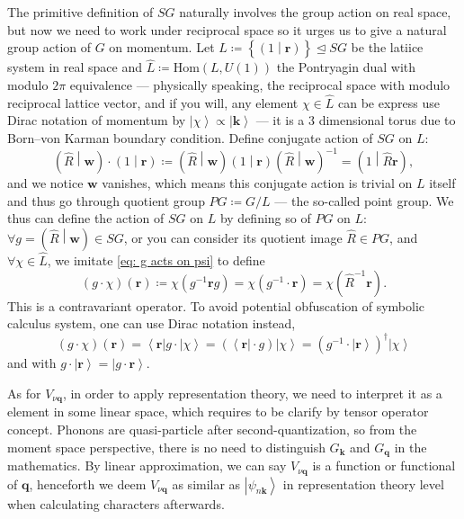 \documentclass[11pt, reqno]{amsart}
\theoremstyle{definition}
\theoremstyle{remark}
\newcommand{\lhdeq}{\trianglelefteq}
\begin{document}
The primitive definition of $SG$ naturally involves the group action on real space, but now we need to work under reciprocal space so it urges us to give a natural group action of $G$ on momentum. Let $L\coloneqq \left\{ \left( 1\middle|\mathbf{r} \right) \right\}\lhdeq SG$ be the latiice system in real space and $\widehat{L}\coloneqq \mathrm{Hom}\left( L,U\left(1\right) \right)$ the Pontryagin dual with modulo $2\pi$ equivalence --- physically speaking, the reciprocal space with modulo reciprocal lattice vector, and if you will, any element $\chi\in \widehat{L}$ can be express use Dirac notation of momentum by $\left| \chi \right> \propto  \left| \mathbf{k} \right>$ --- it is a 3 dimensional torus due to Born--von Karman boundary condition. Define conjugate action of $SG$ on $L$:
\begin{equation}
    \left( \hat{R} \middle| \mathbf{w} \right) \cdot \left( 1 \middle| \mathbf{r} \right) \coloneqq \left( \hat{R} \middle| \mathbf{w} \right) \left( 1 \middle| \mathbf{r} \right) \left( \hat{R} \middle| \mathbf{w} \right) ^{-1}=\left( 1 \middle| \hat{R}\mathbf{r} \right) ,
\end{equation}
and we notice $\mathbf{w}$ vanishes, which means this conjugate action is trivial on $L$ itself and thus go through quotient group $PG\coloneqq G/L$ --- the so-called point group. We thus can define the action of $SG$ on $L$ by defining so of $PG$ on $L$: $\forall g=\left( \hat{R} \middle| \mathbf{w} \right) \in SG$, or you can consider its quotient image $\hat{R}\in PG$, and $\forall \chi \in \widehat{L}$, we imitate \eqref{eq: g acts on psi} to define
\begin{equation}
    \left( g\cdot \chi \right) \left( \mathbf{r} \right) \coloneqq \chi \left( g^{-1}\mathbf{r}g \right) =\chi \left( g^{-1}\cdot \mathbf{r} \right) =\chi \left( \hat{R}^{-1}\mathbf{r} \right) .
\end{equation}
This is a contravariant operator. To avoid potential obfuscation of symbolic calculus system, one can use Dirac notation instead,
\begin{equation}
    \left( g\cdot \chi \right) \left( \mathbf{r} \right) =\left< \mathbf{r} \right|g\cdot \left| \chi \right> =\left( \left< \mathbf{r} \right|\cdot g \right) \left| \chi \right> =\left( g^{-1}\cdot \left| \mathbf{r} \right> \right) ^{\dagger}\left| \chi \right>
\end{equation}
and with $g\cdot \left| \mathbf{r} \right> =\left| g\cdot \mathbf{r} \right>$.

As for $V_{\nu\mathbf{q}}$, in order to apply representation theory, we need to interpret it as a element in some linear space, which requires to be clarify by tensor operator concept. Phonons are quasi-particle after second-quantization, so from the moment space perspective, there is no need to distinguish $G_\mathbf{k}$ and $G_{\mathbf{q}}$ in the mathematics. By linear approximation, we can say $V_{\nu \mathbf{q}}$ is a function or functional of $\mathbf{q}$, henceforth we deem $V_{\nu\mathbf{q}}$ as similar as $\left| \psi _{n\mathbf{k}} \right>$ in representation theory level when calculating characters afterwards.
\end{document}
